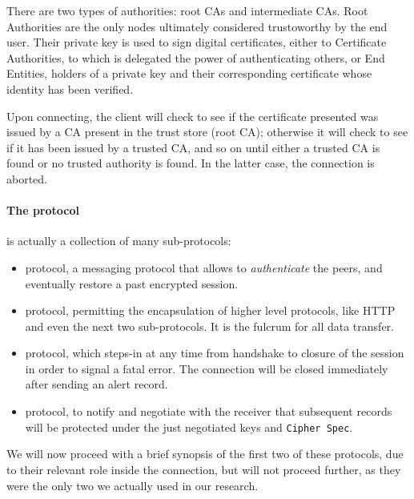 There are two types of authorities: root CAs and intermediate CAs. Root
Authorities are the only nodes ultimately considered trustoworthy by the end
user. Their private key is used to sign digital certificates, either to
Certificate Authorities, to which is delegated the power of authenticating
others, or End Entities, holders of a private key and their corresponding
certificate whose identity has been verified.

Upon connecting, the client will check to see if the certificate presented was issued
by a CA present in the trust store (root CA); otherwise it will check to see if
it has been issued by a trusted CA, and so on until either a trusted CA is
found or no trusted authority is found. In the latter case, the connection is aborted.

\paragraph{The protocol} is actually a collection of many sub-protocols:
\begin{itemize}
  \setlength{\itemsep}{1pt}
  \setlength{\parskip}{0pt}
  \setlength{\parsep}{0pt}
\item {} protocol, a messaging protocol that allows to
  \emph{authenticate} the peers, and eventually restore a past encrypted
  session.
\item {} protocol, permitting the encapsulation of higher level protocols,
  like HTTP and even the next two sub-protocols. It is the fulcrum for all data
  transfer.
\item {} protocol, which steps-in at any time from handshake to closure of the
  session in order to signal a fatal error. The connection will be closed
  immediately after sending an alert record.
\item {} protocol, to notify and negotiate with the receiver that
  subsequent records will be protected under the just negotiated keys and
  \texttt{Cipher Spec}.
\end{itemize}
We will now proceed with a brief synopsis of the first two of these protocols,
due to their relevant role inside the connection, but will not proceed further,
as they were the only two we actually used in our research.


